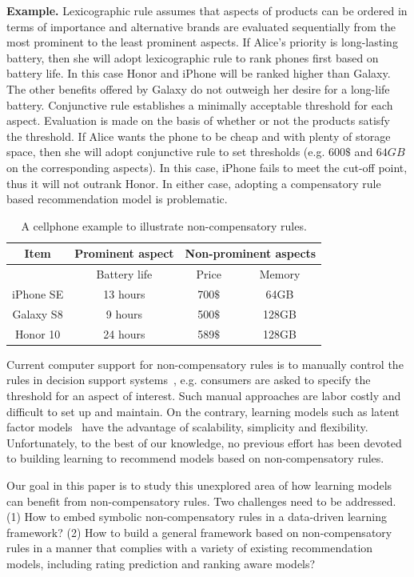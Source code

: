 \documentclass[letterpaper]{article} %
\begin{document}
\textbf{Example.} Lexicographic rule assumes that aspects of products can be ordered in terms of importance and alternative brands are evaluated sequentially from the most prominent to the least prominent aspects.  If Alice's priority is long-lasting battery, then she will adopt lexicographic rule to rank phones first based on battery life. In this case Honor and iPhone will be ranked higher than Galaxy. The other benefits offered by Galaxy  do not outweigh her desire for a long-life battery. Conjunctive rule establishes a minimally acceptable threshold for each aspect. Evaluation is made on the basis of whether or not the products satisfy the threshold. If Alice wants the phone to be cheap and with plenty of storage space, then she will adopt conjunctive rule to set thresholds (e.g. $600\$$ and $64GB$ on the corresponding aspects). In this case, iPhone fails to meet the cut-off point, thus it will not outrank Honor. In either case, adopting a compensatory rule based recommendation model is problematic. 

\begin{table}[htp]
\caption{A cellphone example to illustrate non-compensatory rules.}
\small
\centering
\begin{tabular}{|c|c|c|c|}
\hline
Item & Prominent aspect & \multicolumn{2}{|c|}{Non-prominent aspects}\\\hline
& Battery life &  Price & Memory \\\hline
iPhone SE &  13 hours & 700$\$$ & 64GB  \\\hline
Galaxy S8 & 9 hours& 500$\$$  & 128GB \\\hline
Honor 10 & 24 hours& 589$\$$ & 128GB \\\hline
\end{tabular}
\label{tab:example}
\end{table}
Current computer support for non-compensatory rules is to manually control the rules in decision support systems~\cite{Lee2009Transforming}, e.g. consumers are asked to specify the threshold for an aspect of interest. Such manual approaches are labor costly and difficult to set up and maintain. On the contrary, learning models such as latent factor models~\cite{Koren2009Matrix} have the advantage of scalability, simplicity and flexibility. Unfortunately, to the best of our knowledge, no previous effort has been devoted to building learning to recommend models based on non-compensatory rules. 

Our goal in this paper is to study this unexplored area of how learning models can benefit from non-compensatory rules. Two challenges need to be addressed. (1) How to embed symbolic non-compensatory rules in a data-driven learning framework? (2) How to build a general framework based on non-compensatory rules in a manner that complies with a variety of existing recommendation models, including rating prediction and ranking aware models?  
\end{document}
